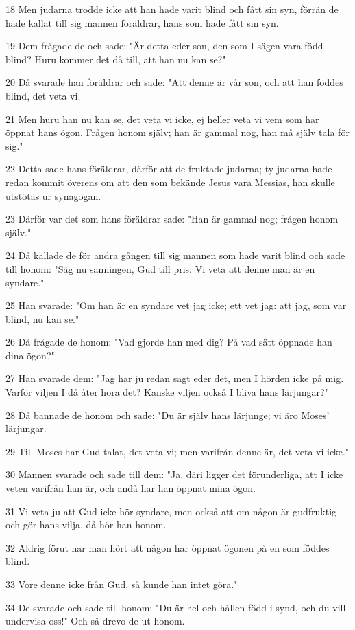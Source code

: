\par 18 Men judarna trodde icke att han hade varit blind och fått sin syn, förrän de hade kallat till sig mannen föräldrar, hans som hade fått sin syn.
\par 19 Dem frågade de och sade: "Är detta eder son, den som I sägen vara född blind? Huru kommer det då till, att han nu kan se?"
\par 20 Då svarade han föräldrar och sade: "Att denne är vår son, och att han föddes blind, det veta vi.
\par 21 Men huru han nu kan se, det veta vi icke, ej heller veta vi vem som har öppnat hans ögon. Frågen honom själv; han är gammal nog, han må själv tala för sig."
\par 22 Detta sade hans föräldrar, därför att de fruktade judarna; ty judarna hade redan kommit överens om att den som bekände Jesus vara Messias, han skulle utstötas ur synagogan.
\par 23 Därför var det som hans föräldrar sade: "Han är gammal nog; frågen honom själv."
\par 24 Då kallade de för andra gången till sig mannen som hade varit blind och sade till honom: "Säg nu sanningen, Gud till pris. Vi veta att denne man är en syndare."
\par 25 Han svarade: "Om han är en syndare vet jag icke; ett vet jag: att jag, som var blind, nu kan se."
\par 26 Då frågade de honom: "Vad gjorde han med dig? På vad sätt öppnade han dina ögon?"
\par 27 Han svarade dem: "Jag har ju redan sagt eder det, men I hörden icke på mig. Varför viljen I då åter höra det? Kanske viljen också I bliva hans lärjungar?"
\par 28 Då bannade de honom och sade: "Du är själv hans lärjunge; vi äro Moses' lärjungar.
\par 29 Till Moses har Gud talat, det veta vi; men varifrån denne är, det veta vi icke."
\par 30 Mannen svarade och sade till dem: "Ja, däri ligger det förunderliga, att I icke veten varifrån han är, och ändå har han öppnat mina ögon.
\par 31 Vi veta ju att Gud icke hör syndare, men också att om någon är gudfruktig och gör hans vilja, då hör han honom.
\par 32 Aldrig förut har man hört att någon har öppnat ögonen på en som föddes blind.
\par 33 Vore denne icke från Gud, så kunde han intet göra."
\par 34 De svarade och sade till honom: "Du är hel och hållen född i synd, och du vill undervisa oss!" Och så drevo de ut honom.
